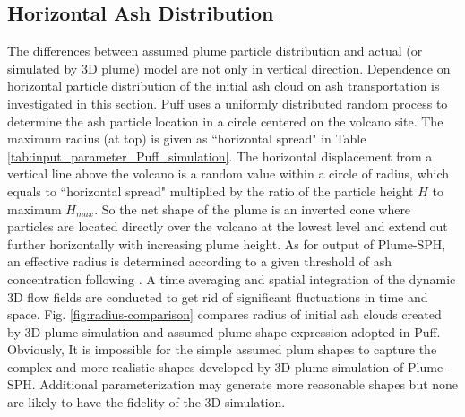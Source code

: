 \documentclass[draft,linenumbers]{agujournal2019}
\begin{document}
\subsection{Horizontal Ash Distribution}

The differences between assumed plume particle distribution and actual (or simulated by 3D plume) model are not only in vertical direction. Dependence on horizontal particle distribution of the initial ash cloud on ash transportation is investigated in this section. Puff uses a uniformly distributed random process to determine the ash particle location in a circle centered on the volcano site. The maximum radius (at top) is given as ``horizontal spread" in Table \ref{tab:input_parameter_Puff_simulation}. The horizontal displacement from a vertical line above the volcano is a random value within a circle of radius, which equals to ``horizontal spread" multiplied by the ratio of the particle height $H$ to maximum $H_{max}$. So the net shape of the plume is an inverted cone where particles are located directly over the volcano at the lowest level and extend out further horizontally with increasing plume height. As for output of Plume-SPH, an effective radius is determined according to a given threshold of ash concentration following \citet {cerminara2016large}. A time averaging and spatial integration of the dynamic 3D flow fields are conducted to get rid of significant fluctuations in time and space. Fig. \ref{fig:radius-comparison} compares radius of initial ash clouds created by 3D plume simulation and assumed plume shape expression adopted in Puff. Obviously, It is impossible for the simple assumed plum shapes to capture the complex and more realistic shapes developed by 3D plume simulation of Plume-SPH. Additional parameterization may generate more reasonable shapes but none are likely to have the fidelity of the 3D simulation.

\end{document}
